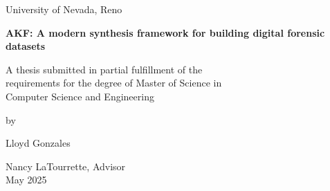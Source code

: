 \documentclass[letterpaper,12pt]{report}
\begin{document}

\newpage
\thispagestyle{empty}
\singlespacing

\begin{center}

\null

\vspace{1.5in}

University of Nevada, Reno \\

\vspace{1.5in}

\textbf{AKF: A modern synthesis framework for building digital forensic datasets}

\vspace{1.5in}

A thesis submitted in partial fulfillment of the\\
requirements for the degree of Master of Science in\\
Computer Science and Engineering\\

\vspace{1in}

by

\vspace{0.25in}
Lloyd Gonzales
\vspace{0.5in}

Nancy LaTourrette, Advisor \\
May 2025\\

\end{center}


\setcounter{page}{0}

\newpage
\onehalfspace
\end{document}
